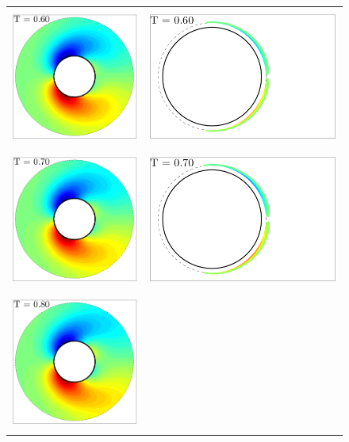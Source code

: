 \begin{figure}
 \begin{center}
 \begin{tabular}{cc}
 \includegraphics[height=4.5cm]{./Figures/results/static/vorticity_T0_60.pdf} &
 \includegraphics[height=4.5cm]{./Figures/results/static/vortices_T0_60.pdf}  \\
 \includegraphics[height=4.5cm]{./Figures/results/static/vorticity_T0_70.pdf} &
 \includegraphics[height=4.5cm]{./Figures/results/static/vortices_T0_70.pdf}  \\
 \includegraphics[height=4.5cm]{./Figures/results/static/vorticity_T0_80.pdf} &

\end{tabular}
\end{center}
\end{figure}
